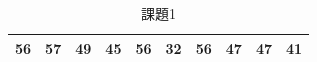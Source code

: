 \begin{table}[ht]
	\centering
	\caption{課題1}
	\label{exe:20_1}
	\begin{tabular}{rrrrrrrrrr}
		\hline
		56 & 57 & 49 & 45 & 56 & 32 & 56 & 47 & 47 & 41 \\
		\hline
	\end{tabular}
\end{table}
